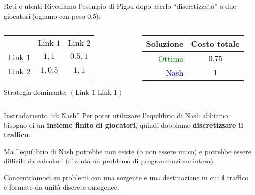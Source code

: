 \documentclass{beamer}
\theoremstyle{plain}
\theoremstyle{definition}
\theoremstyle{remark}
\newcommand{\pa}[1]{\left(#1\right)}
\begin{document}
\begin{frame}{Reti e utenti}
  Rivediamo l'esempio di Pigou dopo averlo ``discretizzato'' a due
  giocatori (ognuno con peso $0.5$):
  \begin{center}
  \end{center}
  
  \begin{columns}
    \begin{column}{0.56\textwidth}
      \begin{tabular}{rcc}
        & Link $1$ & Link $2$ \\
        \cline{2-3}
        Link $1$ & \multicolumn{1}{|c|}{$1,1$} & \multicolumn{1}{|c|}{$0.5,1$}  \\
        \cline{2-3}
        Link $2$ & \multicolumn{1}{|c|}{$1,0.5$} & \multicolumn{1}{|c|}{$1,1$}  \\
        \cline{2-3}
      \end{tabular}
      \vspace{3px}

      Strategia dominante: $\pa{\text{Link }1, \text{Link }1}$
    \end{column}
    \begin{column}{0.44\textwidth}
      \begin{tabular}{r|c}
        Soluzione & Costo totale \\
        \hline
        \textcolor{green}{Ottima} & $0.75$ \\
        \textcolor{blue}{Nash} & $1$
      \end{tabular}
    \end{column}
  \end{columns}
\end{frame}

\begin{frame}{Instradamento ``di Nash''}
  Per poter utilizzare l'equilibrio di Nash abbiamo bisogno di un
  \textbf{insieme finito di giocatori}, quindi dobbiamo
  \textbf{discretizzare il traffico}.

  Ma l'equilibrio di Nash potrebbe non esiste (o non essere unico) e
  potrebbe essere difficile da calcolare (diventa un problema di
  programmazione intera).
  \vfill

  Concentriamoci su problemi con una sorgente e una destinazione in
  cui il traffico è formato da unità discrete omogenee.
\end{frame}
\end{document}
